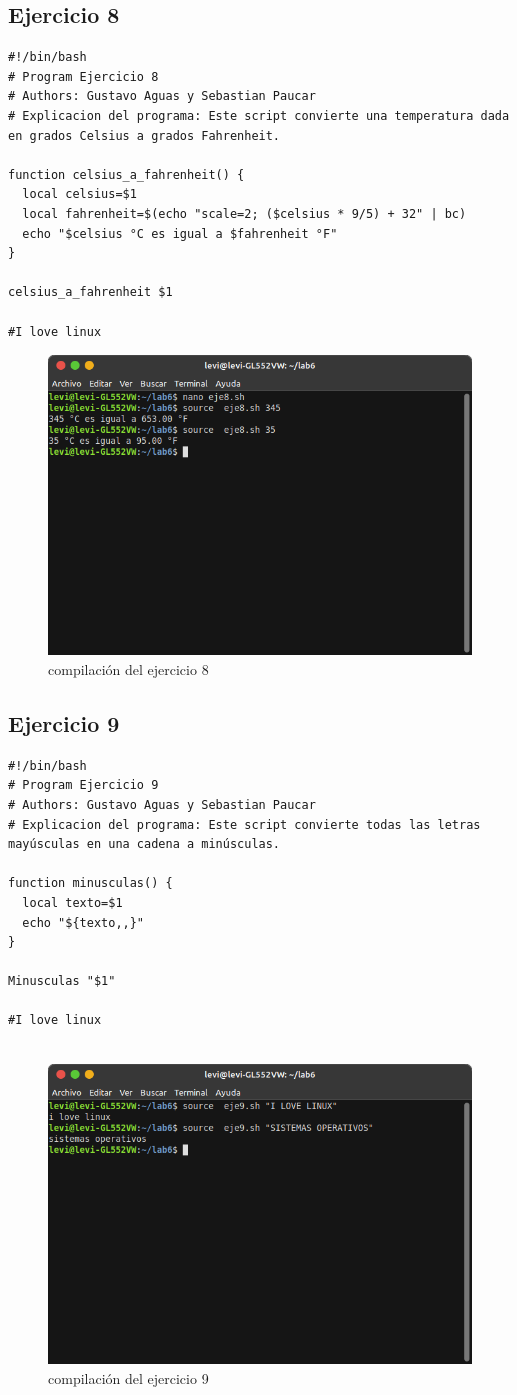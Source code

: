 \documentclass[11pt,twoside]{book}
\begin{document}
\subsection{Ejercicio 8}
\begin{lstlisting}
#!/bin/bash
# Program Ejercicio 8
# Authors: Gustavo Aguas y Sebastian Paucar
# Explicacion del programa: Este script convierte una temperatura dada en grados Celsius a grados Fahrenheit.

function celsius_a_fahrenheit() {
  local celsius=$1
  local fahrenheit=$(echo "scale=2; ($celsius * 9/5) + 32" | bc)
  echo "$celsius °C es igual a $fahrenheit °F"
}

celsius_a_fahrenheit $1

#I love linux
\end{lstlisting}
\begin{figure}[h]
    \centering
    \includegraphics[width=0.6\linewidth]{img_tarea6/eje8con.png}
    \caption{ compilación del ejercicio 8}
\end{figure}
\newpage
\subsection{Ejercicio 9}
\begin{lstlisting}
#!/bin/bash
# Program Ejercicio 9
# Authors: Gustavo Aguas y Sebastian Paucar
# Explicacion del programa: Este script convierte todas las letras mayúsculas en una cadena a minúsculas.

function minusculas() {
  local texto=$1
  echo "${texto,,}"
}

Minusculas "$1"

#I love linux


\end{lstlisting}
\begin{figure}[h]
    \centering
    \includegraphics[width=0.8\linewidth]{img_tarea6/eje9con.png}
    \caption{ compilación del ejercicio 9}
\end{figure}
\newpage
\end{document}
